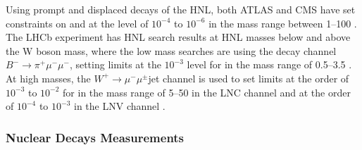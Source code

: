 Using prompt and displaced decays of the HNL, both ATLAS and CMS have set constraints on  and  at the level of $10^{-4}$ to $10^{-6}$ in the mass range between \SIrange{1}{100}{\gev} .
The LHCb experiment has HNL search results at HNL masses below and above the W boson mass, where the low mass searches are using the decay channel $B^- \rightarrow \pi^+ \mu^- \mu^-$, setting limits at the $10^{-3}$ level for  in the mass range of \SIrange{0.5}{3.5}{\gev} . At high masses, the $W^+ \rightarrow \mu^- \mu^\pm$jet channel is used to set limits at the order of $10^{-3}$ to $10^{-2}$ for  in the mass range of \SIrange{5}{50}{\gev} in the LNC channel and at the order of $10^{-4}$ to $10^{-3}$ in the LNV channel .







\subsubsection{Nuclear Decays Measurements}

